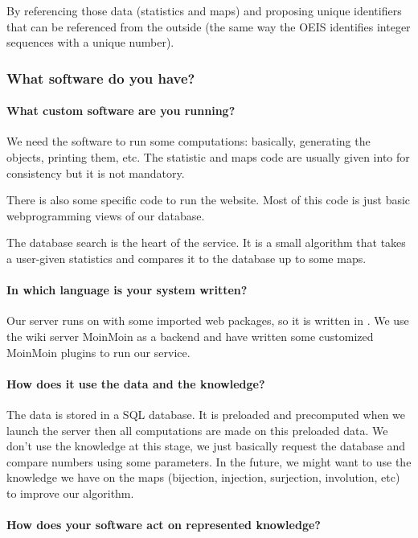 By referencing those data (statistics and maps) and proposing unique identifiers that can be referenced from the outside (the same way the OEIS identifies integer sequences with a unique number).

\subsubsection{What software do you have?}
 \paragraph{What custom software are you running?}

We need the software \SageMath to run some computations: basically, generating the objects, printing them, etc. The statistic and maps code are usually given into \SageMath for consistency but it is not mandatory.

There is also some \FindStat specific code to run the website. Most of this code is just basic webprogramming views of our database.

The database search is the heart of the service. It is a small algorithm that takes a user-given statistics and compares it to the database up to some maps.

\paragraph{In which language is your system written?}

Our server runs on \SageMath with some imported web packages, so it is written in \python. We use the \python wiki server \textsf{MoinMoin} as a backend and have written some customized \textsf{MoinMoin} plugins to run our service.

 \paragraph{How does it use the data and the knowledge?}

The data is stored in a SQL database. It is preloaded and precomputed when we launch the server then all computations are made on this preloaded data. We don't use the knowledge at this stage, we just basically request the database and compare numbers using some parameters. In the future, we might want to  use the knowledge we have on the maps (bijection, injection, surjection, involution, etc) to improve our algorithm.

\paragraph{How does your software act on represented knowledge?}

